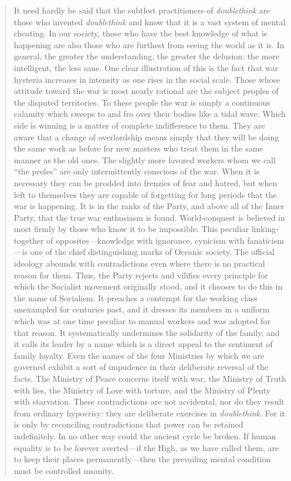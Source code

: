 \begin{paracol}{2}
\begin{quotation}
It need hardly be said that the subtlest practitioners of
\emph{doublethink} are those who invented \emph{doublethink} and know
that it is a vast system of mental cheating. In our society, those who
have the best knowledge of what is happening are also those who are
furthest from seeing the world as it is. In general, the greater the
understanding, the greater the delusion: the more intelligent, the less
sane. One clear illustration of this is the fact that war hysteria
increases in intensity as one rises in the social scale. Those whose
attitude toward the war is most nearly rational are the subject peoples
of the disputed territories. To these people the war is simply a
continuous calamity which sweeps to and fro over their bodies like a
tidal wave. Which side is winning is a matter of complete indifference
to them. They are aware that a change of overlordship means simply that
they will be doing the same work as before for new masters who treat
them in the same manner as the old ones. The slightly more favored
workers whom we call ``the proles'' are only intermittently conscious of
the war. When it is necessary they can be prodded into frenzies of fear
and hatred, but when left to themselves they are capable of forgetting
for long periods that the war is happening. It is in the ranks of the
Party, and above all of the Inner Party, that the true war enthusiasm is
found. World-conquest is believed in most firmly by those who know it to
be impossible. This peculiar linking-together of opposites---knowledge
with ignorance, cynicism with fanaticism---is one of the chief
distinguishing marks of Oceanic society. The official ideology abounds
with contradictions even where there is no practical reason for them.
Thus, the Party rejects and vilifies every principle for which the
Socialist movement originally stood, and it chooses to do this in the
name of Socialism. It preaches a contempt for the working class
unexampled for centuries past, and it dresses its members in a uniform
which was at one time peculiar to manual workers and was adopted for
that reason. It systematically undermines the solidarity of the family,
and it calls its leader by a name which is a direct appeal to the
sentiment of family loyalty. Even the names of the four Ministries by
which we are governed exhibit a sort of impudence in their deliberate
reversal of the facts. The Ministry of Peace concerns itself with war,
the Ministry of Truth with lies, the Ministry of Love with torture, and
the Ministry of Plenty with starvation. These contradictions are not
accidental, nor do they result from ordinary hypocrisy: they are
deliberate exercises in \emph{doublethink}. For it is only by
reconciling contradictions that power can be retained indefinitely. In
no other way could the ancient cycle be broken. If human equality is to
be forever averted---if the High, as we have called them, are to keep
their places permanently---then the prevailing mental condition must be
controlled insanity.


\end{quotation}
\end{paracol}
